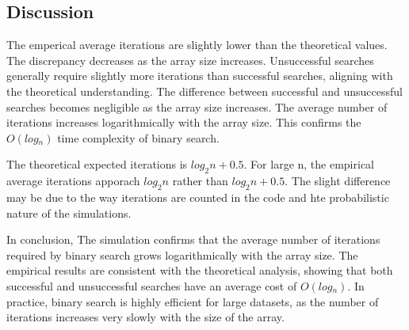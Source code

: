 \documentclass{article}
\begin{document}
\subsection{Discussion}

\hspace{\parindent}The emperical average iterations are slightly lower than the theoretical values. The discrepancy decreases as the array size increases. Unsuccessful searches generally require slightly more iterations than successful searches, aligning with the theoretical understanding. The difference between successful and unsuccessful searches becomes negligible as the array size increases. The average number of iterations increases logarithmically with the array size. This confirms the $O(log⁡_n)$ time complexity of binary search.
\newline

The theoretical expected iterations is $log_2n + 0.5$. For large n, the empirical average iterations apporach $log_2n$ rather than $log_2n + 0.5$. The slight difference may be due to the way iterations are counted in the code and hte probabilistic nature of the simulations.
\newline

In conclusion, The simulation confirms that the average number of iterations required by binary search grows logarithmically with the array size. The empirical results are consistent with the theoretical analysis, showing that both successful and unsuccessful searches have an average cost of $O(log⁡_n)$. In practice, binary search is highly efficient for large datasets, as the number of iterations increases very slowly with the size of the array.

\printbibliography
\end{document}
